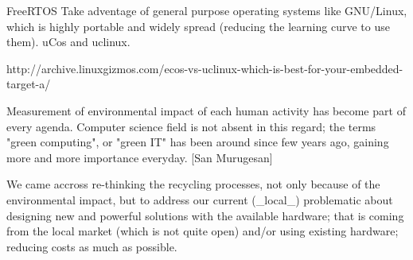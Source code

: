 FreeRTOS 
Take adventage of general purpose operating systems like GNU/Linux, which is highly portable and widely spread (reducing the learning curve to use them). uCos and uclinux.  

http://archive.linuxgizmos.com/ecos-vs-uclinux-which-is-best-for-your-embedded-target-a/


Measurement of environmental impact of each human activity has become part of 
every agenda. Computer science field is not absent in this regard; the terms 
"green computing", or "green IT" has been around since few years ago, gaining
 more and more importance everyday. [San Murugesan]

We came accross re-thinking the recycling processes, not only because of the 
environmental impact, but to address our current (_local_) problematic about
designing new and powerful solutions with the available hardware; that is 
coming from the local market (which is not quite open) and/or using existing 
hardware; reducing costs as much as possible. 


 
